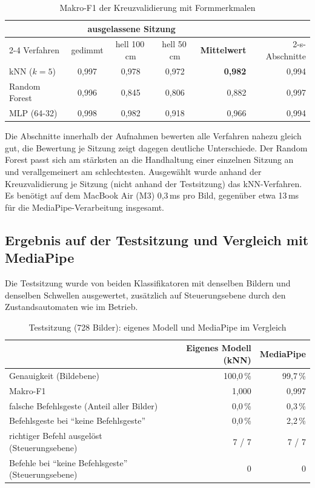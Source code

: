\documentclass[11pt,a4paper]{article}
\begin{document}
\begin{table}[H]
\centering
\small
\begin{tabular}{lcccrr}
\toprule
 & \multicolumn{3}{c}{ausgelassene Sitzung} & & \\
\cmidrule(lr){2-4}
Verfahren & gedimmt & hell 100\,cm & hell 50\,cm & \textbf{Mittelwert} & 2-s-Abschnitte \\
\midrule
kNN ($k = 5$) & 0,997 & 0,978 & 0,972 & \textbf{0,982} & 0,994 \\
Random Forest & 0,996 & 0,845 & 0,806 & 0,882 & 0,997 \\
MLP (64-32) & 0,998 & 0,982 & 0,918 & 0,966 & 0,994 \\
\bottomrule
\end{tabular}
\caption{Makro-F1 der Kreuzvalidierung mit Formmerkmalen}
\label{tab:cv}
\end{table}

Die Abschnitte innerhalb der Aufnahmen bewerten alle Verfahren nahezu gleich gut, die Bewertung je
Sitzung zeigt dagegen deutliche Unterschiede. Der Random Forest passt sich am stärksten an die
Handhaltung einer einzelnen Sitzung an und verallgemeinert am schlechtesten. Ausgewählt wurde
anhand der Kreuzvalidierung je Sitzung (nicht anhand der Testsitzung) das kNN-Verfahren. Es
benötigt auf dem MacBook Air (M3) 0,3\,ms pro Bild, gegenüber etwa 13\,ms für die
MediaPipe-Verarbeitung insgesamt.

\subsection{Ergebnis auf der Testsitzung und Vergleich mit MediaPipe}

Die Testsitzung wurde von beiden Klassifikatoren mit denselben Bildern und denselben Schwellen
ausgewertet, zusätzlich auf Steuerungsebene durch den Zustandsautomaten wie im Betrieb.

\begin{table}[H]
\centering
\small
\begin{tabular}{lrr}
\toprule
 & Eigenes Modell (kNN) & MediaPipe \\
\midrule
Genauigkeit (Bildebene) & 100,0\,\% & 99,7\,\% \\
Makro-F1 & 1,000 & 0,997 \\
falsche Befehlsgeste (Anteil aller Bilder) & 0,0\,\% & 0,3\,\% \\
Befehlsgeste bei \enquote{keine Befehlsgeste} & 0,0\,\% & 2,2\,\% \\
richtiger Befehl ausgelöst (Steuerungsebene) & 7 / 7 & 7 / 7 \\
Befehle bei \enquote{keine Befehlsgeste} (Steuerungsebene) & 0 & 0 \\
\bottomrule
\end{tabular}
\caption{Testsitzung (728 Bilder): eigenes Modell und MediaPipe im Vergleich}
\label{tab:test}
\end{table}
\end{document}
